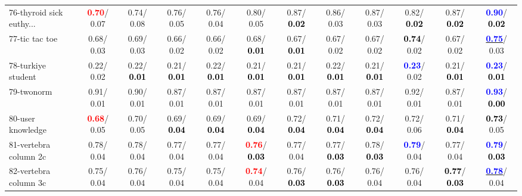 \begin{table}[h]
\begin{center}
{\begin{tabular}{lc|c|c|c|c|c|c|c|c|c|c}
76-thyroid sick euthy... & \textcolor{red}{\textbf{  0.70}}/  0.07 &   0.74/  0.08 &   0.76/  0.05 &   0.76/  0.04 &   0.80/  0.05 &   0.87/\textcolor{black}{\textbf{  0.02}} &   0.86/  0.03 &   0.87/  0.03 &   0.82/\textcolor{black}{\textbf{  0.02}} &   0.87/\textcolor{black}{\textbf{  0.02}} & \textcolor{blue}{\textbf{  0.90}}/\textcolor{black}{\textbf{  0.02}} \\
77-tic tac toe &   0.68/  0.03 &   0.69/  0.03 &   0.66/  0.02 &   0.66/  0.02 &   0.68/\textcolor{black}{\textbf{  0.01}} &   0.67/\textcolor{black}{\textbf{  0.01}} &   0.67/  0.02 &   0.67/  0.02 & \textcolor{black}{\textbf{  0.74}}/  0.02 &   0.67/  0.02 & \underline{\textcolor{blue}{\textbf{  0.75}}}/  0.03 \\
78-turkiye student &   0.22/  0.02 &   0.22/\textcolor{black}{\textbf{  0.01}} &   0.21/\textcolor{black}{\textbf{  0.01}} &   0.22/\textcolor{black}{\textbf{  0.01}} &   0.21/\textcolor{black}{\textbf{  0.01}} &   0.21/\textcolor{black}{\textbf{  0.01}} &   0.22/\textcolor{black}{\textbf{  0.01}} &   0.21/\textcolor{black}{\textbf{  0.01}} & \textcolor{blue}{\textbf{  0.23}}/  0.02 &   0.21/\textcolor{black}{\textbf{  0.01}} & \textcolor{blue}{\textbf{  0.23}}/\textcolor{black}{\textbf{  0.01}} \\ \hline
79-twonorm &   0.91/  0.01 &   0.90/  0.01 &   0.87/  0.01 &   0.87/  0.01 &   0.87/  0.01 &   0.87/  0.01 &   0.87/  0.01 &   0.87/  0.01 &   0.92/  0.01 &   0.87/  0.01 & \textcolor{blue}{\textbf{  0.93}}/\textcolor{black}{\textbf{  0.00}} \\
80-user knowledge & \textcolor{red}{\textbf{  0.68}}/  0.05 &   0.70/  0.05 &   0.69/\textcolor{black}{\textbf{  0.04}} &   0.69/\textcolor{black}{\textbf{  0.04}} &   0.69/\textcolor{black}{\textbf{  0.04}} &   0.72/\textcolor{black}{\textbf{  0.04}} &   0.71/\textcolor{black}{\textbf{  0.04}} &   0.72/\textcolor{black}{\textbf{  0.04}} &   0.72/  0.06 &   0.71/\textcolor{black}{\textbf{  0.04}} & \textcolor{black}{\textbf{  0.73}}/  0.05 \\
81-vertebra column 2c &   0.78/  0.04 &   0.78/  0.04 &   0.77/  0.04 &   0.77/  0.04 & \textcolor{red}{\textbf{  0.76}}/\textcolor{black}{\textbf{  0.03}} &   0.77/  0.04 &   0.77/\textcolor{black}{\textbf{  0.03}} &   0.78/\textcolor{black}{\textbf{  0.03}} & \textcolor{blue}{\textbf{  0.79}}/  0.04 &   0.77/  0.04 & \textcolor{blue}{\textbf{  0.79}}/\textcolor{black}{\textbf{  0.03}} \\
82-vertebra column 3c &   0.75/  0.04 &   0.76/  0.04 &   0.75/  0.04 &   0.75/  0.04 & \textcolor{red}{\textbf{  0.74}}/  0.04 &   0.76/\textcolor{black}{\textbf{  0.03}} &   0.76/\textcolor{black}{\textbf{  0.03}} &   0.76/  0.04 &   0.76/  0.04 & \textcolor{black}{\textbf{  0.77}}/\textcolor{black}{\textbf{  0.03}} & \underline{\textcolor{blue}{\textbf{  0.78}}}/  0.04 \\

\end{tabular}}
\end{center}
\end{table}
